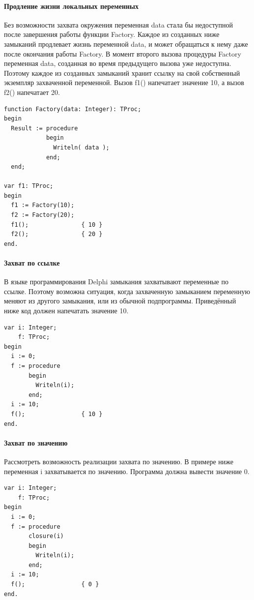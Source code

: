 \documentclass{imcs}
\begin{document}
\paragraph{Продление жизни локальных переменных}
Без возможности захвата окружения переменная data стала бы недоступной после завершения
работы функции Factory. Каждое из созданных ниже замыканий продлевает жизнь переменной
data, и может обращаться к нему даже после окончания работы Factory. В момент второго
вызова процедуры Factory переменная data, созданная во время предыдущего вызова уже
недоступна. Поэтому каждое из созданных замыканий хранит ссылку на свой собственный
экземпляр захваченной переменной. Вызов f1() напечатает значение 10, а вызов f2()
напечатает 20.
\begin{lstlisting}
function Factory(data: Integer): TProc;
begin
  Result := procedure
            begin
              Writeln( data );
            end;
  end;
    
var f1: TProc;
begin
  f1 := Factory(10);
  f2 := Factory(20);
  f1();               { 10 }
  f2();               { 20 }
end.
\end{lstlisting}    

\paragraph{Захват по ссылке}
В языке программирования Delphi замыкания захватывают переменные по ссылке. Поэтому
возможна ситуация, когда захваченную замыканием переменную меняют из другого замыкания,
или из обычной подпрограммы. Приведённый ниже код должен напечатать значение 10.
\begin{lstlisting}
var i: Integer;
    f: TProc;
begin
  i := 0;
  f := procedure
       begin
         Writeln(i);
       end;
  i := 10;
  f();                { 10 }
end.
\end{lstlisting}

\paragraph{Захват по значению}
Рассмотреть возможность реализации захвата по значению. В примере ниже переменная
i захватывается по значению. Программа должна вывести значение 0.
\begin{lstlisting}
var i: Integer;
    f: TProc;
begin
  i := 0;
  f := procedure
       closure(i)
       begin
         Writeln(i);
       end;
  i := 10;
  f();                { 0 }
end.
\end{lstlisting}
\end{document}
